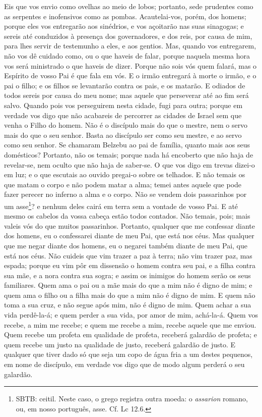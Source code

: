 Eis que vos envio como ovelhas ao meio de lobos; portanto, sede
prudentes como as serpentes e inofensivos como as pombas.
A\-cau\-te\-lai-vos, porém, dos homens; porque eles vos entregarão
aos sinédrios, e vos açoitarão nas suas sinagogas; e sereis
até conduzidos à presença dos governadores, e dos reis, por causa de
mim, para lhes servir de testemunho a eles, e aos gentios.
Mas, quando vos entregarem, não vos dê cuidado como, ou o que
haveis de falar, porque naquela mesma hora vos será ministrado o que
haveis de dizer. Porque não sois vós quem falará, mas o
Espírito de vosso Pai é que fala em vós. E o irmão entregará
à morte o irmão, e o pai o filho; e os filhos se levantarão contra
os pais, e os matarão. E odiados de todos sereis por causa do
meu nome; mas aquele que perseverar até ao fim será salvo.
Quando pois vos perseguirem nesta cidade, fugi para outra;
porque em verdade vos digo que não acabareis de percorrer as cidades
de Israel sem que venha o Filho do homem. Não é o discípulo
mais do que o mestre, nem o servo mais do que o seu senhor.
Basta ao discípulo ser como seu mestre, e ao servo como seu
senhor. Se chamaram Belzebu ao pai de família, quanto mais aos seus
domésticos? Portanto, não os temais; porque nada há encoberto
que não haja de revelar-se, nem oculto que não haja de saber-se.
O que vos digo em trevas dizei-o em luz; e o que escutais ao
ouvido pregai-o sobre os telhados. E não temais os que matam
o corpo e não podem matar a alma; temei antes aquele que pode fazer
perecer no inferno a alma e o corpo. Não se vendem dois
passarinhos por um asse\footnote{SBTB: ceitil. Neste caso, o grego
registra outra moeda: o \emph{assarion} romano, ou, em nosso
português, asse. Cf. Lc 12.6.}? e nenhum deles cairá em terra sem a
vontade de vosso Pai. E até mesmo os cabelos da vossa cabeça
estão todos contados. Não temais, pois; mais valeis vós do
que muitos passarinhos. Portanto, qualquer que me confessar
diante dos homens, eu o confessarei diante de meu Pai, que está nos
céus. Mas qualquer que me negar diante dos homens, eu o
negarei também diante de meu Pai, que está nos céus. Não
cuideis que vim trazer a paz à terra; não vim trazer paz, mas
espada; porque eu vim pôr em dissensão o homem contra seu
pai, e a filha contra sua mãe, e a nora contra sua sogra; e
assim os inimigos do homem serão os seus familiares. Quem ama
o pai ou a mãe mais do que a mim não é digno de mim; e quem ama o
filho ou a filha mais do que a mim não é digno de mim. E quem
não toma a sua cruz, e não segue após mim, não é digno de mim.
Quem achar a sua vida perdê-la-á; e quem perder a sua vida,
por amor de mim, achá-la-á. Quem vos recebe, a mim me recebe;
e quem me recebe a mim, recebe aquele que me enviou. Quem
recebe um profeta em qualidade de profeta, receberá galardão de
profeta; e quem recebe um justo na qualidade de justo, receberá
galardão de justo. E qualquer que tiver dado só que seja um
copo de água fria a um destes pequenos, em nome de discípulo, em
verdade vos digo que de modo algum perderá o seu galardão.

